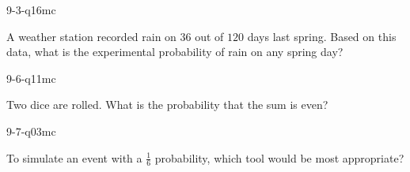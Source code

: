 \begin{practiceQuestion}{9-3-q16}{mc}
\begin{questionText}
A weather station recorded rain on $36$ out of $120$ days last spring. Based on this data, what is the experimental probability of rain on any spring day?
\end{questionText}
\end{practiceQuestion}

\begin{practiceQuestion}{9-6-q11}{mc}
\begin{questionText}
Two dice are rolled. What is the probability that the sum is even?
\end{questionText}
\end{practiceQuestion}

\begin{practiceQuestion}{9-7-q03}{mc}
\begin{questionText}
To simulate an event with a $\frac{1}{6}$ probability, which tool would be most appropriate?
\end{questionText}
\end{practiceQuestion}
